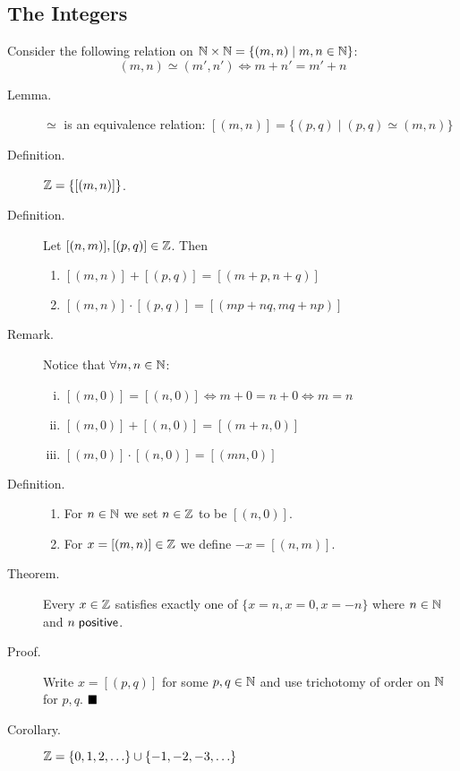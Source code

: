 \documentclass[letterpaper,11pt]{article}
\begin{document}
\subsection{The Integers}
Consider the following relation on $\mathbb{N}\times\mathbb{N} = \{(m,n)\;|\;m,n\in\mathbb{N}\}$:
\[
(m,n)\simeq(m',n') \iff m+n' = m'+n
\]
\begin{description}
\item[Lemma.] $\simeq$ is an equivalence relation:
    $[(m,n)] = \{(p,q)\;|\;(p,q)\simeq(m,n)\}$

\item[Definition.] $\mathbb{Z}=\{[(m,n)]\}$.

\item[Definition.] Let $[(n,m)], [(p,q)]\in\mathbb{Z}$. Then
  \begin{enumerate}[1)]
  \item $[(m,n)]+[(p,q)] = [(m+p,n+q)]$
  \item $[(m,n)]\cdot [(p,q)] = [(mp+nq,mq+np)]$
  \end{enumerate}

\item[Remark.] Notice that $\forall m,n\in\mathbb{N}$:
  \begin{enumerate}[i)]
  \item $[(m,0)]=[(n,0)]\iff m+0=n+0 \iff m=n$
  \item $[(m,0)]+[(n,0)] = [(m+n,0)]$
  \item $[(m,0)]\cdot [(n,0)] = [(mn, 0)]$
  \end{enumerate}


\item[Definition.]\mbox{}
  \begin{enumerate}[1)]
  \item For $n\in\mathbb{N}$ we set $n\in\mathbb{Z}$ to be $[(n,0)]$.
  \item For $x=[(m,n)]\in\mathbb{Z}$ we define $-x=[(n,m)]$.
  \end{enumerate}


\item[Theorem.] Every $x\in\mathbb{Z}$ satisfies exactly one of
    $\{x=n, x=0, x=-n\}$ where $n\in\mathbb{N}$ and $n\;\mathsf{positive}$.
\item[Proof.] Write $x=[(p,q)]$ for some $p,q\in\mathbb{N}$
    and use trichotomy of order on $\mathbb{N}$ for $p,q$. $\hfill\blacksquare$
\item[Corollary.] $\mathbb{Z}=\{0,1,2,\ldots\}\cup\{-1,-2,-3,\ldots\}$



\end{description}
\end{document}
